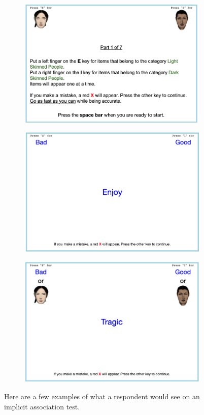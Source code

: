 \begin{figure}[H]
\begin{subfigure}{.48\textwidth}
\centering
\includegraphics[width=.9\linewidth]{iatexample3.png}
\end{subfigure}
\begin{subfigure}{.48\textwidth}
\centering
\includegraphics[width=.9\linewidth]{iatexample4.png}
\end{subfigure}
\begin{subfigure}{.48\textwidth}
\centering
\includegraphics[width=.9\linewidth]{iatexample5.png}
\end{subfigure}
\caption*{\footnotesize{Here are a few examples of what a respondent would see on an implicit association test.}}
\end{figure}

